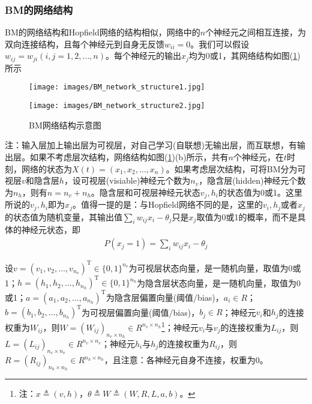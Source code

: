         \subsubsection{BM的网络结构}
            \par
            BM的网络结构和Hopfield网络的结构相似，网络中的$n$个神经元之间相互连接，为双向连接结构，且每个神经元到自身无反馈$w_{ii} = 0$。我们可以假设$w_{ij} = w_{ji}(i,j=1,2,\dots,n)$。每个神经元的输出$x_j$均为0或1，其网络结构如图(\ref{fig:BM网络结构示意图})所示
			\begin{figure}[H]
  			\centering
  			\begin{varwidth}[t]{\textwidth}
    			\vspace{0pt}
    			\texttt{[image: images/BM\_network\_structure1.jpg]}
  			\end{varwidth}
  			\qquad
  			\begin{varwidth}[t]{\textwidth}
    			\vspace{0pt}
    			\texttt{[image: images/BM\_network\_structure2.jpg]}
  			\end{varwidth}
            \caption{BM网络结构示意图}
            \label{fig:BM网络结构示意图}
            \end{figure}
            注：输入层加上输出层为可视层，对自己学习(自联想)无输出层，而互联想，有输出层。如果不考虑层次结构，网络结构如图(\ref{fig:BM网络结构示意图})(b)所示，共有$n$个神经元，在$t$时刻，网络的状态为$X(t) = (x_1,x_2,\dots,x_n)$。如果考虑层次结构，可将BM分为可视层$v$和隐含层$h$，设可视层(visiable)神经元个数为$n_v$，隐含层(hidden)神经元个数为$n_h$，则有$n = n_v+n_h$。隐含层和可视层神经元状态$v_j,h_i$的状态值为0或1。这里所说的$v_j,h_i$即为$x_j$。值得一提的是：与Hopfield网络不同的是，这里的$v_i,h_j$或者$x_j$的状态值为随机变量，其输出值$\sum_i w_{ij}x_i - \theta_j$只是$x_j$取值为0或1的概率，而不是具体的神经元状态，即
            \begin{align*}
            P(x_j = 1) = \sum_i w_{ij}x_i - \theta_j
            \end{align*}
            \par
            设$v = (v_1,v_2,\dots,v_{n_v})^\mathrm{T} \in \{0,1\}^{n_v}$为可视层状态向量，是一随机向量，取值为0或1；$h = (h_1,h_2,\dots,h_{n_h})^\mathrm{T} \in \{0,1\}^{n_h}$为隐含层状态向量，是一随机向量，取值为0或1；$a = (a_1,a_2,\dots,a_{n_h})^\mathrm{T}$为隐含层偏置向量(阈值/bias)，$a_i\in R$；$b = (b_1,b_2,\dots,b_{n_h})^\mathrm{T}$为可视层偏置向量(阈值/bias)，$b_j\in R$；神经元$v_i$和$h_j$的连接权重为$W_{ij}$，则$W = (W_{ij})_{n_v\times n_h}\in R^{n_v\times n_h}$\footnote{注：$x \triangleq (v,h)$，$\theta \triangleq W \triangleq (W,R,L,a,b)$。}；神经元$v_i$与$v_j$的连接权重为$L_{ij}$，则$L = (L_{ij})_{n_v\times n_v}\in R^{n_v\times n_v}$；神经元$h_i$与$h_j$的连接权重为$R_{ij}$，则$R = (R_{ij})_{n_h\times n_h}\in R^{n_h\times n_h}$，且注意：各神经元自身不连接，权重为0。
